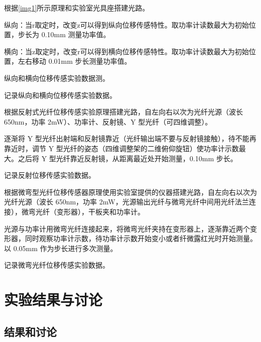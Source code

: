 \documentclass[UTF8]{ctexart}
\begin{document}
\par
根据\ref{img1}所示原理和实验室光具座搭建光路。
\par
纵向：当r取定时，改变z可以得到纵向位移传感特性。取功率计读数最大为初始位置，步长为 0.10mm 测量功率值。
\par
横向：当z取定时，改变r可以得到横向位移传感特性。取功率计读数最大为初始位置，左右移动 0.01mm 步长测量功率值。
\par
纵向和横向位移传感实验数据测。
\par
记录纵向和横向位移传感实验数据。
\vspace{1em}

\par
根据反射式光纤位移传感实验原理搭建光路，自左向右以次为光纤光源（波长 650nm，功率 2mW）、功率计、反射镜、Y 型光纤（可四维调整）。
\par
逐渐将 Y 型光纤出射端和反射镜靠近（光纤输出端不要与反射镜接触），待不能再靠近时，调节 Y 型光纤的姿态（四维调整架的二维俯仰旋钮）使功率计示数最大。之后将 Y 型光纤靠近反射镜，从距离最近处开始测量，0.10mm 步长。
\par
记录反射位移传感实验数据。
\vspace{1em}

\par
根据微弯型光纤位移传感器原理使用实验室提供的仪器搭建光路，自左向右以次为光纤光源（波长 650nm，功率 2mW，光源输出光纤与微弯光纤中间用光纤法兰连接），微弯光纤（变形器），干板夹和功率计。
\par
光源与功率计用微弯光纤连接起来，将微弯光纤夹持在变形器上，逐渐靠近两个变形器，同时观察功率计示数，待功率计示数开始变小或者纤微露红光时开始测量。以 0.05mm 作为步长进行多次测量。
\par
记录微弯光纤位移传感实验数据。
\vspace{1em}


\section{实验结果与讨论}

\subsection{结果和讨论}
\end{document}
